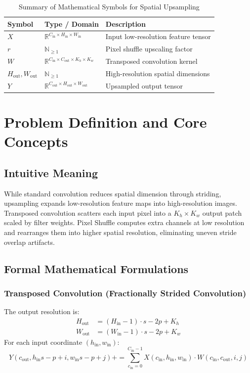 \documentclass[11pt,a4paper]{article}
\theoremstyle{definition}
\begin{document}
\begin{table}[h]
\centering
\caption{Summary of Mathematical Symbols for Spatial Upsampling}
\begin{tabular}{lll}
\toprule
\textbf{Symbol} & \textbf{Type / Domain} & \textbf{Description} \\
\midrule
$X$ & $\mathbb{R}^{C_{\text{in}} \times H_{\text{in}} \times W_{\text{in}}}$ & Input low-resolution feature tensor \\
$r$ & $\mathbb{N}_{\ge 1}$ & Pixel shuffle upscaling factor \\
$W$ & $\mathbb{R}^{C_{\text{in}} \times C_{\text{out}} \times K_h \times K_w}$ & Transposed convolution kernel \\
$H_{\text{out}}, W_{\text{out}}$ & $\mathbb{N}_{\ge 1}$ & High-resolution spatial dimensions \\
$Y$ & $\mathbb{R}^{C_{\text{out}} \times H_{\text{out}} \times W_{\text{out}}}$ & Upsampled output tensor \\
\bottomrule
\end{tabular}
\end{table}

\section{Problem Definition and Core Concepts}

\subsection{Intuitive Meaning}
While standard convolution reduces spatial dimension through striding, upsampling expands low-resolution feature maps into high-resolution images. Transposed convolution scatters each input pixel into a $K_h \times K_w$ output patch scaled by filter weights. Pixel Shuffle computes extra channels at low resolution and rearranges them into higher spatial resolution, eliminating uneven stride overlap artifacts.

\subsection{Formal Mathematical Formulations}

\subsubsection{Transposed Convolution (Fractionally Strided Convolution)}
The output resolution is:
\begin{align}
H_{\text{out}} &= (H_{\text{in}} - 1) \cdot s - 2p + K_h \\
W_{\text{out}} &= (W_{\text{in}} - 1) \cdot s - 2p + K_w
\end{align}
For each input coordinate $(h_{\text{in}}, w_{\text{in}})$:
\begin{equation}
Y(c_{\text{out}}, h_{\text{in}} s - p + i, w_{\text{in}} s - p + j) += \sum_{c_{\text{in}}=0}^{C_{\text{in}}-1} X(c_{\text{in}}, h_{\text{in}}, w_{\text{in}}) \cdot W(c_{\text{in}}, c_{\text{out}}, i, j)
\end{equation}
\end{document}
